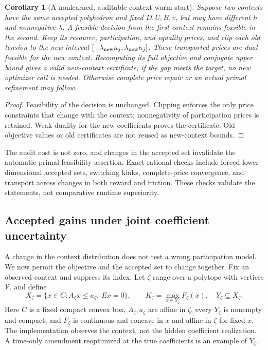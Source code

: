 \documentclass[11pt,letterpaper]{article}
\newtheorem{corollary}[theorem]{Corollary}
\theoremstyle{definition}
\newcommand{\1}{\mathbf 1}
\begin{document}
\begin{corollary}[A nonlearned, auditable context warm start]\label{cor:r22-transport}
Suppose two contexts have the same accepted polyhedron and fixed $D,U,B,v$, but may have different $h$ and nonnegative $\lambda$. A feasible decision from the first context remains feasible in the second. Keep its resource, participation, and equality prices, and clip each old tension to the new interval $[-\lambda_{\rm new}\kappa_j,\lambda_{\rm new}\kappa_j]$. These transported prices are dual-feasible for the new context. Recomputing its full objective and conjugate upper bound gives a valid new-context certificate; if the gap meets the target, no new optimizer call is needed. Otherwise complete price repair or an actual primal refinement may follow.
\end{corollary}
\begin{proof}
Feasibility of the decision is unchanged. Clipping enforces the only price constraints that change with the context; nonnegativity of participation prices is retained. Weak duality for the new coefficients proves the certificate. Old objective values or old certificates are not reused as new-context bounds.
\end{proof}
The audit cost is not zero, and changes in the accepted set invalidate the automatic primal-feasibility assertion. Exact rational checks include forced lower-dimensional accepted sets, switching kinks, complete-price convergence, and transport across changes in both reward and friction. These checks validate the statements, not comparative runtime superiority.

\subsection{Accepted gains under joint coefficient uncertainty}\label{sec:r23-robust}
A change in the context distribution does not test a wrong participation model. We now permit the objective and the accepted set to change together. Fix an observed context and suppress its index. Let $\zeta$ range over a polytope with vertices $\mathcal V$, and define
\[
 X_\zeta=\{x\in C:A_\zeta x\leq a_\zeta,\ Ex=0\},\qquad
 K_\zeta=\max_{x\in Y_\zeta}F_\zeta(x),\quad Y_\zeta\subseteq X_\zeta.
\]
Here $C$ is a fixed compact convex box, $A_\zeta,a_\zeta$ are affine in $\zeta$, every $Y_\zeta$ is nonempty and compact, and $F_\zeta$ is continuous and concave in $x$ and affine in $\zeta$ for fixed $x$. The implementation observes the context, not the hidden coefficient realization. A time-only amendment reoptimized at the true coefficients is an example of $Y_\zeta$.
\end{document}
